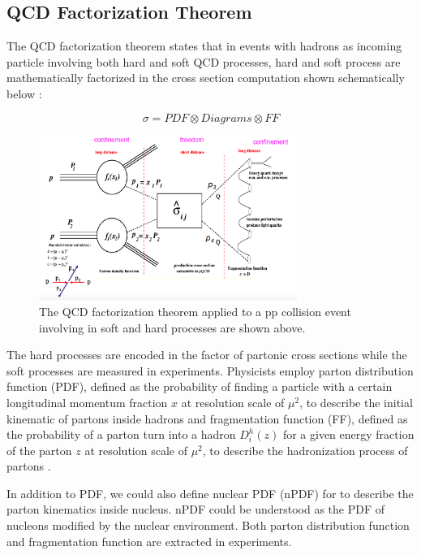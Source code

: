 \subsection{QCD Factorization Theorem}

The QCD factorization theorem states that in events with hadrons as incoming particle involving both hard and soft QCD processes, hard and soft process are mathematically factorized in the cross section computation shown schematically below \cite{QCDFactorization}: 

\begin{equation}
\sigma = PDF \otimes Diagrams \otimes FF
\end{equation}

\begin{figure}[hbtp]
\begin{center}
\includegraphics[width=0.75\textwidth]{Figures/Chapter1/QCDFactorizationTheorem.png}
\caption{The QCD factorization theorem applied to a pp collision event involving in soft and hard processes are shown above.}
\label{QCDFacTheo}
\end{center}
\end{figure} 

The hard processes are encoded in the factor of partonic cross sections while the soft processes are measured in experiments. Physicists employ parton distribution function (PDF), defined as the probability of finding a particle with a certain longitudinal momentum fraction $x$ at resolution scale of $\mu^2$, to describe the initial kinematic of partons inside hadrons \cite{PDFRef} and fragmentation function (FF), defined as the probability of a parton turn into a hadron $D_i^h(z)$ for a given energy fraction of the parton $z$ at resolution scale of $\mu^2$, to describe the hadronization process of partons \cite{QCDFFunc}. 

In addition to PDF, we could also define nuclear PDF (nPDF) for \cite{nPDF} to describe the parton kinematics inside nucleus. nPDF could be understood as the PDF of nucleons modified by the nuclear environment. Both parton distribution function and fragmentation function are extracted in experiments.


